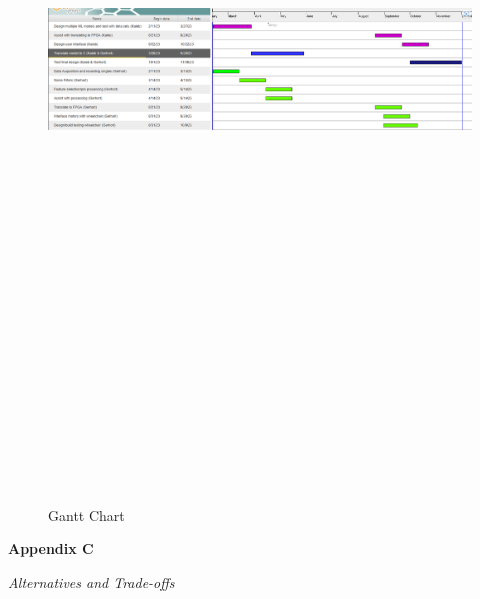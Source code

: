 \documentclass[conference]{IEEEtran}
\begin{document}
    \begin{figure}
        \centering
        \centerline{\includegraphics[angle=90, height=9in, keepaspectratio]{figs/B/gnatt.png}}
            \caption{Gantt Chart}
            \label{fig:gantt}
    \end{figure}
    \twocolumn
    
        
        
\clearpage
\onecolumn
\begin{center}
    \vspace*{5cm}
     {\Huge\bfseries Appendix C \par}
     \vspace{1cm}
    \textit{Alternatives and Trade-offs} \\
\end{center}
\clearpage
\twocolumn
\end{document}
